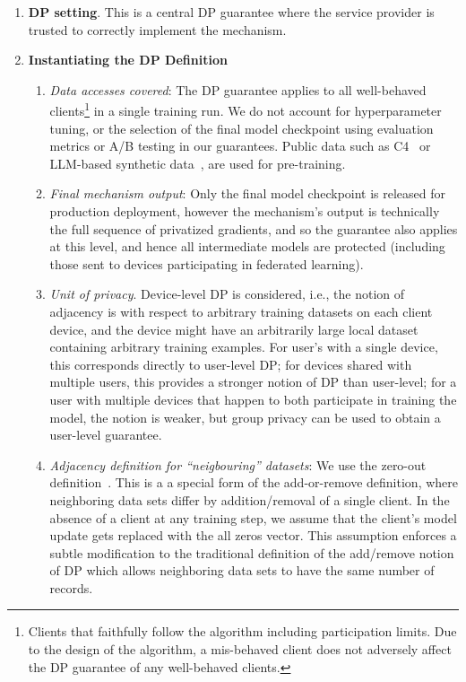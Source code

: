 \begin{enumerate}
    \item \textbf{DP setting}. This is a central DP guarantee where the service provider is trusted to correctly implement the mechanism.
    \item \textbf{Instantiating the DP Definition}
     \begin{enumerate}
        \item \textit{Data accesses covered}: The DP guarantee applies to all well-behaved clients\footnote{Clients that faithfully follow the algorithm including participation limits. Due to the design of the algorithm, a mis-behaved client does not adversely affect the DP guarantee of any well-behaved clients.} in a single training run. We do not account for hyperparameter tuning, or the selection of the final model checkpoint using evaluation metrics or A/B testing in our guarantees. Public data such as C4~\citep{xue2020mt5} or LLM-based synthetic data~\citep{wu2024prompt}, are used for pre-training. 
        \item \textit{Final mechanism output}: Only the final model checkpoint is released for production deployment, however the mechanism’s output is technically the full sequence of privatized gradients, and so the guarantee also applies at this level, and hence all intermediate models are protected (including those sent to devices participating in federated learning). 
        \item \textit{Unit of privacy}. Device-level DP is considered, i.e., the notion of adjacency is with respect to arbitrary training datasets on each client device, and the device might have an arbitrarily large local dataset containing arbitrary training examples. For user's with a single device, this corresponds directly to user-level DP; for devices shared with multiple users, this provides a stronger notion of DP than user-level; for a user with multiple devices that happen to both participate in training the model, the notion is weaker, but group privacy can be used to obtain a user-level guarantee.
        \item \textit{Adjacency definition for ``neigbouring'' datasets}: We use the zero-out definition~\citep{kairouz21practical}. This is a a special form of the add-or-remove definition, where neighboring data sets differ by addition/removal of a single client. In the absence of a client at any training step, we assume that the client's model update gets replaced with the all zeros vector. This assumption enforces a subtle modification to the traditional definition of the add/remove notion of DP which allows neighboring data sets to have the same number of records.

\end{enumerate}
\end{enumerate}
